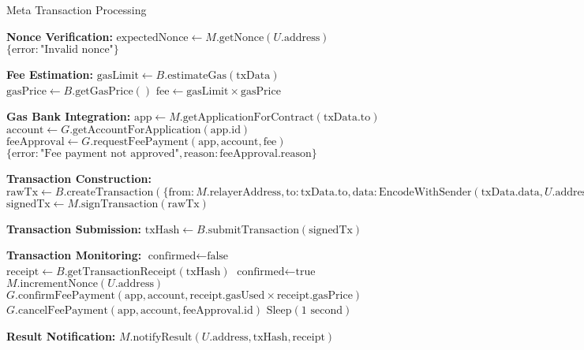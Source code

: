 \begin{tcolorbox}
\begin{tcolorbox}
\begin{protocol}{Meta Transaction Processing}
\begin{algorithmic}[1]
\State \textbf{Nonce Verification:}
\State $\text{expectedNonce} \gets M.\text{getNonce}(U.\text{address})$
    \State \Return $\{\text{error}: \text{"Invalid nonce"}\}$
\EndIf

\State \textbf{Fee Estimation:}
\State $\text{gasLimit} \gets B.\text{estimateGas}(\text{txData})$
\State $\text{gasPrice} \gets B.\text{getGasPrice}()$
\State $\text{fee} \gets \text{gasLimit} \times \text{gasPrice}$

\State \textbf{Gas Bank Integration:}
\State $\text{app} \gets M.\text{getApplicationForContract}(\text{txData}.\text{to})$
\State $\text{account} \gets G.\text{getAccountForApplication}(\text{app}.\text{id})$
\State $\text{feeApproval} \gets G.\text{requestFeePayment}(\text{app}, \text{account}, \text{fee})$
    \State \Return $\{\text{error}: \text{"Fee payment not approved"}, \text{reason}: \text{feeApproval}.\text{reason}\}$
\EndIf

\State \textbf{Transaction Construction:}
\State $\text{rawTx} \gets B.\text{createTransaction}(\{\text{from}: M.\text{relayerAddress}, \text{to}: \text{txData}.\text{to}, \text{data}: \text{EncodeWithSender}(\text{txData}.\text{data}, U.\text{address}), \text{value}: \text{txData}.\text{value}, \text{gasLimit}: \text{gasLimit}, \text{gasPrice}: \text{gasPrice}\})$
\State $\text{signedTx} \gets M.\text{signTransaction}(\text{rawTx})$

\State \textbf{Transaction Submission:}
\State $\text{txHash} \gets B.\text{submitTransaction}(\text{signedTx})$

\State \textbf{Transaction Monitoring:}
\State $\text{confirmed} \gets \text{false}$
    \State $\text{receipt} \gets B.\text{getTransactionReceipt}(\text{txHash})$
        \State $\text{confirmed} \gets \text{true}$
            \State $M.\text{incrementNonce}(U.\text{address})$
            \State $G.\text{confirmFeePayment}(\text{app}, \text{account}, \text{receipt}.\text{gasUsed} \times \text{receipt}.\text{gasPrice})$
        \Else
            \State $G.\text{cancelFeePayment}(\text{app}, \text{account}, \text{feeApproval}.\text{id})$
        \EndIf
    \EndIf
        \State $\text{Sleep}(1\text{ second})$
    \EndIf
\EndWhile

\State \textbf{Result Notification:}
\State $M.\text{notifyResult}(U.\text{address}, \text{txHash}, \text{receipt})$


\end{algorithmic}
\end{protocol}
\end{tcolorbox}
\end{tcolorbox}
